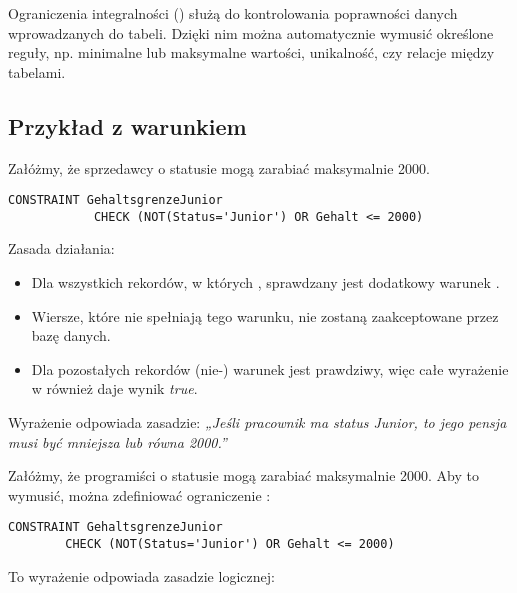    Ograniczenia integralności () służą do kontrolowania poprawności danych 
    wprowadzanych do tabeli. Dzięki nim można automatycznie wymusić określone reguły, 
    np. minimalne lub maksymalne wartości, unikalność, czy relacje między tabelami.

\subsection{Przykład z warunkiem }

    Załóżmy, że sprzedawcy o statusie  mogą zarabiać maksymalnie 2000.

    \begin{lstlisting}[style=sqlstyle]
        CONSTRAINT GehaltsgrenzeJunior
            CHECK (NOT(Status='Junior') OR Gehalt <= 2000)
    \end{lstlisting}

    Zasada działania:
    \begin{itemize}
        \item Dla wszystkich rekordów, w których , 
        sprawdzany jest dodatkowy warunek .
        \item Wiersze, które nie spełniają tego warunku, nie zostaną zaakceptowane przez bazę danych.
        \item Dla pozostałych rekordów (nie-) warunek  jest prawdziwy, 
        więc całe wyrażenie w  również daje wynik \textit{true}.
    \end{itemize}

    Wyrażenie  odpowiada zasadzie:
    \textit{„Jeśli pracownik ma status Junior, to jego pensja musi być mniejsza lub równa 2000.”}


    Załóżmy, że programiści o statusie  mogą zarabiać maksymalnie 2000.  
    Aby to wymusić, można zdefiniować ograniczenie :

    \begin{lstlisting}[style=sqlstyle]
    CONSTRAINT GehaltsgrenzeJunior
        CHECK (NOT(Status='Junior') OR Gehalt <= 2000)
    \end{lstlisting}


    To wyrażenie odpowiada zasadzie logicznej:

